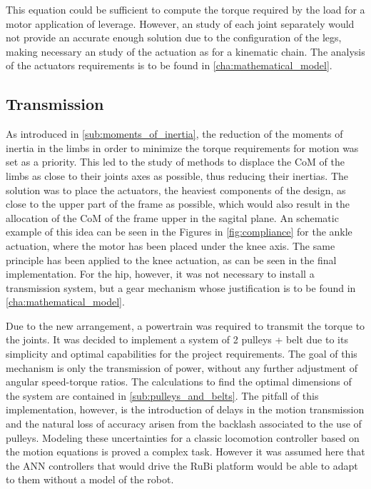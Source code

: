 This equation could be sufficient to compute the torque required by the load for a motor application of leverage. 
However, an study of each joint separately would not provide an accurate enough solution due to the configuration of the legs, making necessary an study of the actuation as for a kinematic chain.
The analysis of the actuators requirements is to be found in \ref{cha:mathematical_model}.


\subsection{Transmission} %
\label{sub:transmission}
As introduced in \ref{sub:moments_of_inertia}, the reduction of the moments of inertia in the limbs in order to minimize the torque requirements for motion was set as a priority.
This led to the study of methods to displace the CoM of the limbs as close to their joints axes as possible, thus reducing their inertias.
The solution was to place the actuators, the heaviest components of the design, as close to the upper part of the frame as possible, which would also result in the allocation of the CoM of the frame upper in the sagital plane.
An schematic example of this idea can be seen in the Figures in \ref{fig:compliance} for the ankle actuation, where the motor has been placed under the knee axis. 
The same principle has been applied to the knee actuation, as can be seen in the final implementation. 
For the hip, however, it was not necessary to install a transmission system, but a gear mechanism whose justification is to be found in \ref{cha:mathematical_model}.

Due to the new arrangement, a powertrain was required to transmit the torque to the joints.
It was decided to implement a system of 2 pulleys + belt due to its simplicity and optimal capabilities for the project requirements.
The goal of this mechanism is only the transmission of power, without any further adjustment of angular speed-torque ratios.
The calculations to find the optimal dimensions of the system are contained in \ref{sub:pulleys_and_belts}.
The pitfall of this implementation, however, is the introduction of delays in the motion transmission and the natural loss of accuracy arisen from the backlash associated to the use of pulleys.
Modeling these uncertainties for a classic locomotion controller based on the motion equations is proved a complex task. 
However it was assumed here that the ANN controllers that would drive the RuBi platform would be able to adapt to them without a model of the robot.


